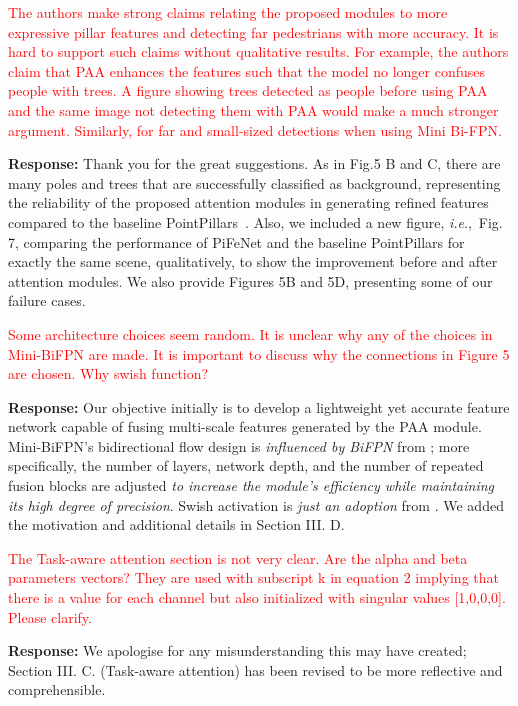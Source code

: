 \documentclass[11pt]{article}
\def\ie{\emph{i.e}.,~} \def\Ie{\emph{I.e}.,~}
\begin{document}
\textcolor{red}{The authors make strong claims relating the proposed modules to more
expressive pillar features and detecting far pedestrians with more
accuracy. It is hard to support such claims without qualitative
results. For example, the authors claim that PAA enhances the features
such that the model no longer confuses people with trees. A figure
showing trees detected as people before using PAA and the same image
not detecting them with PAA would make a much stronger argument.
Similarly, for far and small-sized detections when using Mini Bi-FPN.} 

\textbf{Response:} Thank you for the great suggestions. As in Fig.5 B and C, there are many poles and trees that are successfully classified as background, representing the reliability of the proposed attention modules in generating refined features compared to the baseline PointPillars~\cite{lang2019pointpillars}. Also, we included a new figure, \ie Fig. 7, comparing the performance of PiFeNet and the baseline PointPillars for exactly the same scene, qualitatively, to show the improvement before and after attention modules. We also provide Figures 5B and 5D, presenting some of our failure cases. 

\textcolor{red}{Some architecture choices seem random. It is unclear why any of the
choices in Mini-BiFPN are made. It is important to discuss why the
connections in Figure 5 are chosen. Why swish function?} 

\textbf{Response:} Our objective initially is to develop a lightweight yet accurate feature network capable of fusing multi-scale features generated by the PAA module. Mini-BiFPN's bidirectional flow design is \textit{influenced by BiFPN} from \cite{tan2020efficientdet}; more specifically, the number of layers, network depth, and the number of repeated fusion blocks are adjusted \textit{to increase the module's efficiency while maintaining its high degree of precision}. Swish activation is \textit{just an adoption} from \cite{tan2020efficientdet}. We added the motivation and additional details in Section III. D.

\textcolor{red}{The Task-aware attention section is not very clear. Are the alpha and
beta parameters vectors? They are used with subscript k in equation 2
implying that there is a value for each channel but also initialized
with singular values [1,0,0,0]. Please clarify.} 

\textbf{Response:} We apologise for any misunderstanding this may have created; Section III. C. (Task-aware attention) has been revised to be more reflective and comprehensible. 
\end{document}
